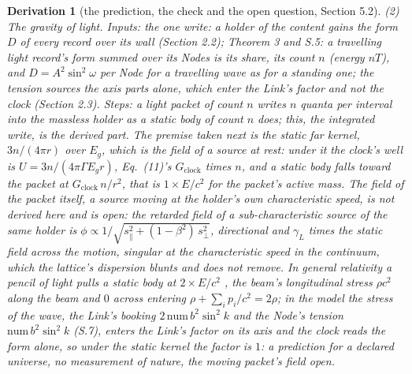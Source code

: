 \documentclass[pdflatex,sn-mathphys-num]{sn-jnl}
\newcommand{\num}{\mathrm{num}}
\theoremstyle{thmstyleone}
\newtheorem{derivation}{Derivation}
\begin{document}
\begin{derivation}[the prediction, the check and the open question, Section 5.2]
\emph{(2) The gravity of light.} \emph{Inputs:} the one write: a holder of the content gains the form $D$ of every record over its wall (Section 2.2); Theorem 3 and S.5: a travelling light record's form summed over its Nodes is its share, its count $n$ (energy $nT$), and $D = A^2\sin^2\omega$ per Node for a travelling wave as for a standing one; the tension sources the axis parts alone, which enter the Link's factor and not the clock (Section 2.3). \emph{Steps:} a light packet of count $n$ writes $n$ quanta per interval into the massless holder as a static body of count $n$ does; this, the integrated write, is the derived part. The premise taken next is the static far kernel, $3n / (4\pi r)$ over $E_g$, which is the field of a source at rest: under it the clock's well is $U = 3n / (4\pi\Gamma E_g r)$, Eq.~(11)'s $G_{\mathrm{clock}}$ times $n$, and a static body falls toward the packet at $G_{\mathrm{clock}}\,n / r^2$, that is $1 \times E / c^2$ for the packet's active mass. The field of the packet itself, a source moving at the holder's own characteristic speed, is not derived here and is open: the retarded field of a sub-characteristic source of the same holder is $\phi \propto 1 / \sqrt{s_\parallel^2 + (1 - \beta^2)\,s_\perp^2}$, directional and $\gamma_L$ times the static field across the motion, singular at the characteristic speed in the continuum, which the lattice's dispersion blunts and does not remove. In general relativity a pencil of light pulls a static body at $2 \times E / c^2$ \cite{tolman}, the beam's longitudinal stress $\rho c^2$ along the beam and $0$ across entering $\rho + \sum_i p_i / c^2 = 2\rho$; in the model the stress of the wave, the Link's booking $2\,\num\,b^2\sin^2 k$ and the Node's tension $\num\,b^2\sin^2 k$ (S.7), enters the Link's factor on its axis and the clock reads the form alone, so under the static kernel the factor is $1$: a prediction for a declared universe, no measurement of nature, the moving packet's field open.

\end{derivation}
\end{document}
